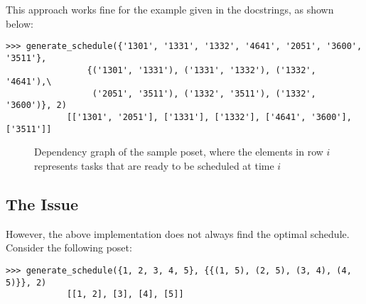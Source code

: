 \documentclass{article}
\begin{document}
This approach works fine for the example given in the docstrings, as shown below:

    \begin{lstlisting}[belowskip=-10pt]
        >>> generate_schedule({'1301', '1331', '1332', '4641', '2051', '3600', '3511'},
                {('1301', '1331'), ('1331', '1332'), ('1332', '4641'),\
                 ('2051', '3511'), ('1332', '3511'), ('1332', '3600')}, 2)
            [['1301', '2051'], ['1331'], ['1332'], ['4641', '3600'], ['3511']]
    \end{lstlisting}

    \begin{figure}[htbp]
        \captionsetup{width=.7\linewidth}
        \centering
        \caption{Dependency graph of the sample poset, where the elements in row $i$ represents tasks that are ready to be scheduled at time $i$}
        \label{fig:sample_test_case}
    \end{figure}

\subsection*{The Issue}
    However, the above implementation does not always find the optimal schedule. Consider the following poset:

    \begin{lstlisting}[belowskip=-10pt]
        >>> generate_schedule({1, 2, 3, 4, 5}, {{(1, 5), (2, 5), (3, 4), (4, 5)}}, 2)
            [[1, 2], [3], [4], [5]]
    \end{lstlisting}
\end{document}
